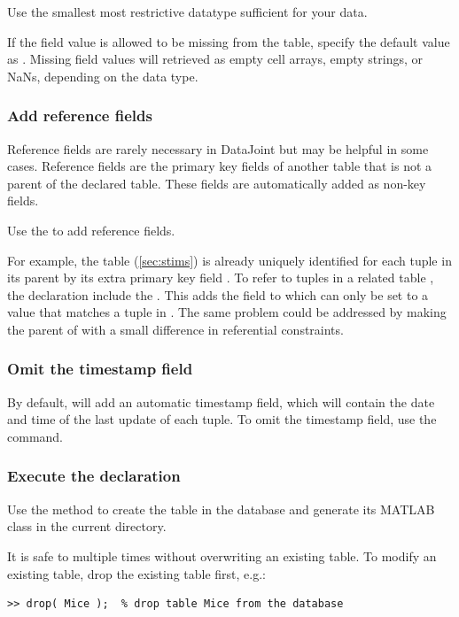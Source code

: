 \documentclass[10pt]{article}
\begin{document}
Use the smallest most restrictive datatype sufficient for your data.  

If the field value is allowed to be missing from the table, specify the default value as \mcode{[]}. Missing field values will retrieved as empty cell arrays, empty strings, or NaNs, depending on the data type.

\subsubsection{Add reference fields}\label{sec:reference}
Reference fields are rarely necessary in DataJoint but may be helpful in some cases. Reference fields are the primary key fields of another table that is not a parent of the declared table.  These fields are automatically added as non-key fields.

Use the  to add reference fields. 

For example, the table  (\autoref{sec:stims}) is already uniquely identified for each tuple in its parent  by its extra primary key field .  To refer to tuples in a related table , the declaration include the . This adds the field  to  which can only be set to a value that matches a tuple in .
The same problem could be addressed by making  the parent of  with a small difference in referential constraints.

\subsubsection{Omit the timestamp field}
By default,  will add an automatic timestamp field, which will contain the date and time of the last update of each tuple. To omit the timestamp field, use the  command.

\subsubsection{Execute the declaration}
Use the  method to create the table in the database and generate its MATLAB class in the current directory. 

It is safe to  multiple times without overwriting an existing table. To modify an existing table, drop the existing table first, e.g.:
\begin{lstlisting}
>> drop( Mice );  % drop table Mice from the database
\end{lstlisting}
\end{document}
